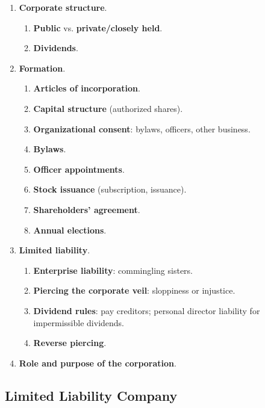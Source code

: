 \begin{enumerate}
    \item \textbf{Corporate structure}.
    \begin{enumerate}
        \item \textbf{Public} vs. \textbf{private/closely held}.
        \item \textbf{Dividends}.
    \end{enumerate}
    \item \textbf{Formation}.
    \begin{enumerate}
        \item \textbf{Articles of incorporation}.
        \item \textbf{Capital structure} (authorized shares).
        \item \textbf{Organizational consent}: bylaws, officers, other 
        business.
        \item \textbf{Bylaws}.
        \item \textbf{Officer appointments}.
        \item \textbf{Stock issuance} (subscription, issuance).
        \item \textbf{Shareholders' agreement}.
        \item \textbf{Annual elections}.
    \end{enumerate}
    \item \textbf{Limited liability}.
    \begin{enumerate}
        \item \textbf{Enterprise liability}: commingling sisters.
        \item \textbf{Piercing the corporate veil}: sloppiness or injustice.
        \item \textbf{Dividend rules}: pay creditors; personal director 
        liability for impermissible dividends.
        \item \textbf{Reverse piercing}.
    \end{enumerate}
    \item \textbf{Role and purpose of the corporation}.
\end{enumerate}

\newpage

\subsection{Limited Liability Company}

